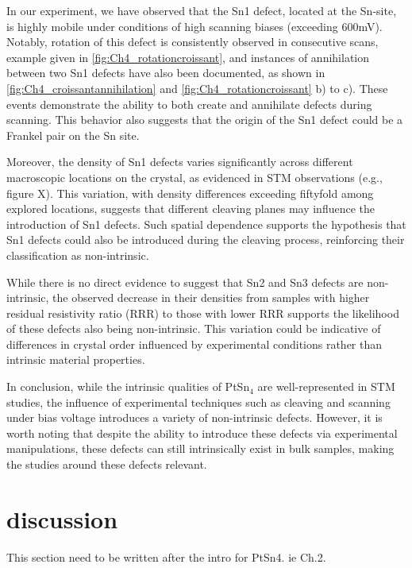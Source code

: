 \par In our experiment, we have observed that the Sn1 defect, located at the Sn-site, is highly mobile under conditions of high scanning biases (exceeding 600mV). Notably, rotation of this defect is consistently observed in consecutive scans, example given in \ref{fig:Ch4_rotationcroissant}, and instances of annihilation between two Sn1 defects have also been documented, as shown in \ref{fig:Ch4_croissantannihilation} and \ref{fig:Ch4_rotationcroissant} b) to c). These events demonstrate the ability to both create and annihilate defects during scanning. This behavior also suggests that the origin of the Sn1 defect could be a Frankel pair on the Sn site. %
\par Moreover, the density of Sn1 defects varies significantly across different macroscopic locations on the crystal, as evidenced in STM observations (e.g., figure X). This variation, with density differences exceeding fiftyfold among explored locations, suggests that different cleaving planes may influence the introduction of Sn1 defects. Such spatial dependence supports the hypothesis that Sn1 defects could also be introduced during the cleaving process, reinforcing their classification as non-intrinsic.

\par While there is no direct evidence to suggest that Sn2 and Sn3 defects are non-intrinsic, the observed decrease in their densities from samples with higher residual resistivity ratio (RRR) to those with lower RRR supports the likelihood of these defects also being non-intrinsic. This variation could be indicative of differences in crystal order influenced by experimental conditions rather than intrinsic material properties.

\par In conclusion, while the intrinsic qualities of PtSn$_4$ are well-represented in STM studies, the influence of experimental techniques such as cleaving and scanning under bias voltage introduces a variety of non-intrinsic defects. However, it is worth noting that despite the ability to introduce these defects via experimental manipulations, these defects can still intrinsically exist in bulk samples, making the studies around these defects relevant. 

\section{discussion}
\par This section need to be written after the intro for PtSn4. ie Ch.2. 

